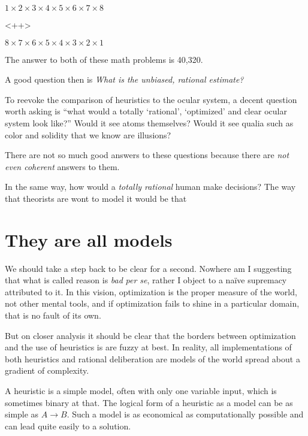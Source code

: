 \documentclass{article}
\begin{document}
\begin{exe}
	\ex $1\times2\times3\times4\times5\times6\times7\times8$
\end{exe}

<++>

\begin{exe}
	\ex $8\times7\times6\times5\times4\times3\times2\times1$ 
\end{exe}

The answer to both of these math problems is 40,320.

A good question then is \textit{What is the \emph{unbiased}, rational estimate?}

To reevoke the comparison of heuristics to the ocular system, a decent question worth asking is ``what would a totally `rational', `optimized' and clear ocular system look like?''
Would it see atoms themselves?
Would it see qualia such as color and solidity that we know are illusions?

There are not so much good answers to these questions because there are \emph{not even coherent} answers to them.

In the same way, how would a \emph{totally rational} human make decisions?
The way that theorists are wont to model it would be that 

\section{They are all models\label{models}}

We should take a step back to be clear for a second.
Nowhere am I suggesting that what is called reason is \emph{bad} \textit{per se}, rather I object to a na{\"i}ve supremacy attributed to it.
In this vision, optimization is the proper measure of the world, not other mental tools, and if optimization fails to shine in a particular domain, that is no fault of its own.

But on closer analysis it should be clear that the borders between optimization and the use of heuristics is are fuzzy at best.
In reality, all implementations of both heuristics and rational deliberation are models of the world spread about a gradient of complexity.

A heuristic is a simple model, often with only one variable input, which is sometimes binary at that.
The logical form of a heuristic as a model can be as simple as $A{\rightarrow}B$.
Such a model is as economical as computationally possible and can lead quite easily to a solution.
\end{document}

